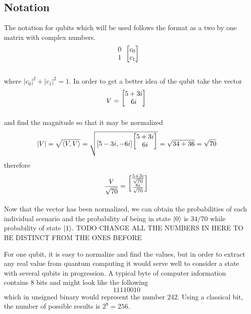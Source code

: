 \documentclass[12pt]{article}
\begin{document}
\subsection{Notation}
The notation for qubits which will be used follows the format as a two by one matrix with complex numbers.
$$ 
\begin{blockarray}{cc}
\begin{block}{c[c]}
0 & c_0 \\
1 & c_1 \\
\end{block}
\end{blockarray}
$$

where $\left| c_0\right |^2 + \left| c_1\right |^2 = 1$. In order to get a better idea of the qubit take the vector
$$ V = 
\begin{blockarray}{c}
\begin{block}{[c]}
5 + 3i \\
6i \\
\end{block}
\end{blockarray}
$$
and find the magnitude so that it may be normalized
$$ \left| V \right| = \sqrt{\langle V, V \rangle} = \sqrt{
  [5-3i, -6i]
\begin{blockarray}{c}
\begin{block}{[c]}
5 + 3i \\
6i \\
\end{block}
\end{blockarray}
} = \sqrt{34+36} = \sqrt{70}
$$
therefore
$$ \frac{V}{\sqrt{70}} = 
\begin{blockarray}{c}
\begin{block}{[c]}
\frac{5 + 3i}{\sqrt{70}} \\
\frac{6i}{\sqrt{70}} \\
\end{block}
\end{blockarray}
$$
Now that the vector has been normalized, we can obtain the probabilities of each individual scenario and the probability of being in state $\ket{0}$ is $34/70$ while probability of state $\ket{1}$. TODO CHANGE ALL THE NUMBERS IN HERE TO BE DISTINCT FROM THE ONES BEFORE\par
For one qubit, it is easy to normalize and find the values, but in order to extract any real value from quantum computing it would serve well to consider a state with several qubits in progression. A typical byte of computer information contains 8 bits and might look like the following $$ 11110010 $$ which in unsigned binary would represent the number $242$. Using a classical bit, the number of possible results is $2^8 = 256$.\par
\end{document}
